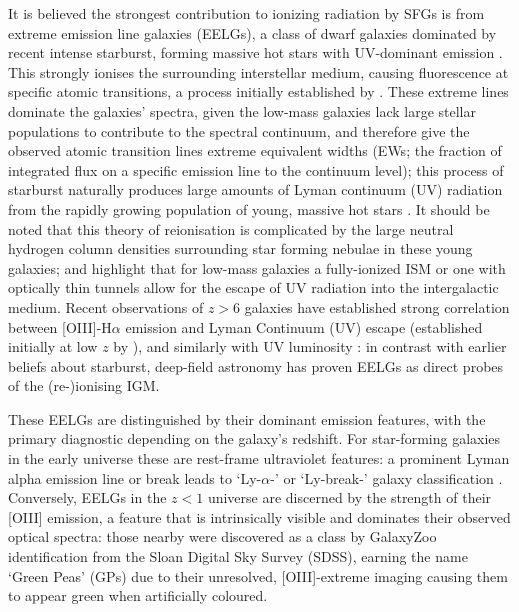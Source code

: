 \documentclass[fleqn,usenatbib]{mnras}
\begin{document}
It is believed the strongest contribution to ionizing radiation by SFGs is from extreme emission line galaxies (EELGs), a class of dwarf galaxies dominated by recent intense starburst, forming massive hot stars with UV-dominant emission \citep{tang2023, davis2024}. This strongly ionises the surrounding interstellar medium, causing fluorescence at specific atomic transitions, a process initially established by \cite{menzel}. These extreme lines dominate the galaxies’ spectra, given the low-mass galaxies lack large stellar populations to contribute to the spectral continuum, and therefore give the observed atomic transition lines extreme equivalent widths (EWs; the fraction of integrated flux on a specific emission line to the continuum level); this process of starburst naturally produces large amounts of Lyman continuum (UV) radiation from the rapidly growing population of young, massive hot stars \citep{madau1999, gigure2008}. It should be noted that this theory of reionisation is complicated by the large neutral hydrogen column densities surrounding star forming nebulae in these young galaxies; \cite{izotov_2018} and \cite{jaskotoey} highlight that for low-mass galaxies a fully-ionized ISM or one with optically thin tunnels allow for the escape of UV radiation into the intergalactic medium. Recent observations of $z>6$ galaxies have established strong correlation between [OIII]-H$\alpha$ emission  and Lyman Continuum (UV) escape \citep{tang2023} (established initially at low $z$ by \cite{flury2022}), and similarly with UV luminosity \citep{endsley2024}: in contrast with earlier \citep{hackman1995} beliefs about starburst, deep-field astronomy has proven EELGs as direct probes of the (re-)ionising IGM. 

These EELGs are distinguished by their dominant emission features, with the primary diagnostic depending on the galaxy's redshift. For star-forming galaxies in the early universe these are rest-frame ultraviolet features: a prominent Lyman alpha emission line or break leads to ‘Ly-$\alpha$-’ or ‘Ly-break-’ galaxy classification \citep{Tacchella_2023_2}. Conversely, EELGs in the $z < 1$ universe are discerned by the strength of their [OIII] emission, a feature that is intrinsically visible and dominates their observed optical spectra: those nearby were discovered as a class by GalaxyZoo \citep{cardamone} identification from the Sloan Digital Sky Survey (SDSS), earning the name ‘Green Peas’ (GPs) due to their unresolved, [OIII]-extreme imaging causing them to appear green when artificially coloured. 
\end{document}
